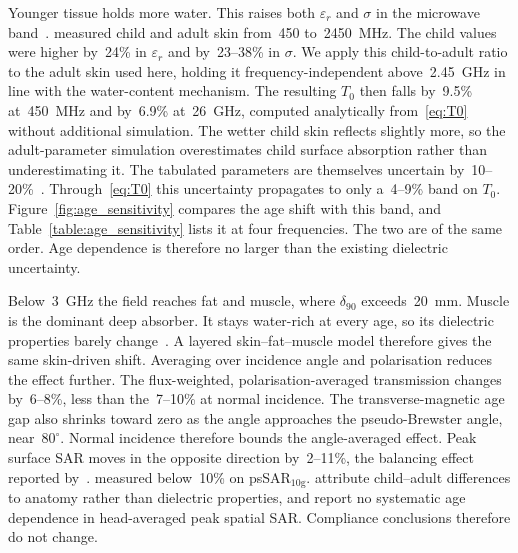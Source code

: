 \documentclass{iopjournal}
\begin{document}
Younger tissue holds more water. This raises both $\varepsilon_r$ and $\sigma$ in the microwave band~\citep{peyman2009dielectric}.
\citet{peyman2009dielectric} measured child and adult skin from~450 to~2450~MHz. The child values were higher by~24\% in $\varepsilon_r$ and by~23--38\% in $\sigma$.
We apply this child-to-adult ratio to the adult skin used here, holding it frequency-independent above~2.45~GHz in line with the water-content mechanism.
The resulting $T_0$ then falls by~9.5\% at~450~MHz and by~6.9\% at~26~GHz, computed analytically from~\eqref{eq:T0} without additional simulation.
The wetter child skin reflects slightly more, so the adult-parameter simulation overestimates child surface absorption rather than underestimating it.
The tabulated parameters are themselves uncertain by~10--20\%~\citep{gabriel1996dielectric,kos2011exposure}.
Through~\eqref{eq:T0} this uncertainty propagates to only a~4--9\% band on $T_0$.
Figure~\ref{fig:age_sensitivity} compares the age shift with this band, and Table~\ref{table:age_sensitivity} lists it at four frequencies.
The two are of the same order. Age dependence is therefore no larger than the existing dielectric uncertainty.

Below~3~GHz the field reaches fat and muscle, where $\delta_{90}$ exceeds~20~mm.
Muscle is the dominant deep absorber. It stays water-rich at every age, so its dielectric properties barely change~\citep{gabriel2005age}.
A layered skin--fat--muscle model therefore gives the same skin-driven shift.
Averaging over incidence angle and polarisation reduces the effect further.
The flux-weighted, polarisation-averaged transmission changes by~6--8\%, less than the~7--10\% at normal incidence.
The transverse-magnetic age gap also shrinks toward zero as the angle approaches the pseudo-Brewster angle, near~$80^\circ$.
Normal incidence therefore bounds the angle-averaged effect.
Peak surface \gls{SAR} moves in the opposite direction by~2--11\%, the balancing effect reported by~\citet{gabriel2005age}.
\citet{peyman2009dielectric} measured below~10\% on psSAR$_{10\mathrm{g}}$. \citet{christ2010age} attribute child--adult differences to anatomy rather than dielectric properties, and report no systematic age dependence in head-averaged peak spatial SAR.
Compliance conclusions therefore do not change.
\end{document}
